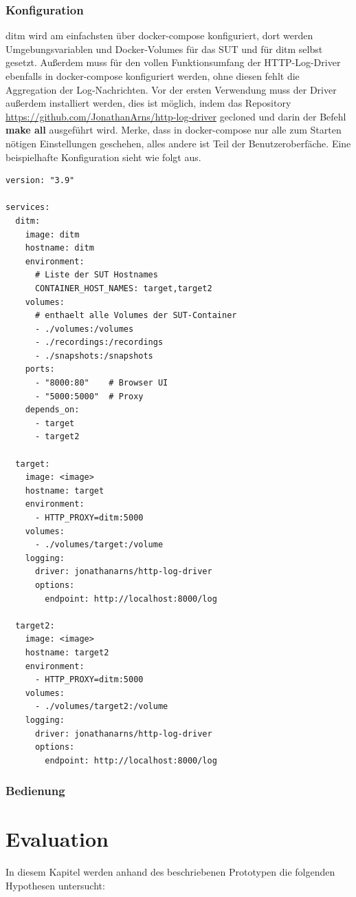 \documentclass[12pt,a4paper]{report}
\begin{document}
\subsection{Konfiguration}
ditm wird am einfachsten über docker-compose konfiguriert, dort werden Umgebungsvariablen und Docker-Volumes für das SUT und für
ditm selbst gesetzt. Außerdem muss für den vollen Funktionsumfang der HTTP-Log-Driver ebenfalls in docker-compose konfiguriert
werden, ohne diesen fehlt die Aggregation der Log-Nachrichten. Vor der ersten Verwendung muss der Driver außerdem installiert
werden, dies ist möglich, indem das Repository \url{https://github.com/JonathanArns/http-log-driver} gecloned und darin der Befehl
\textbf{make all} ausgeführt wird. Merke, dass in docker-compose nur alle zum Starten nötigen Einstellungen geschehen, alles andere ist Teil
der Benutzeroberfäche. Eine beispielhafte Konfiguration sieht wie folgt aus.
\begin{lstlisting}
version: "3.9"

services:
  ditm:
    image: ditm
    hostname: ditm
    environment:
      # Liste der SUT Hostnames
      CONTAINER_HOST_NAMES: target,target2  
    volumes:
      # enthaelt alle Volumes der SUT-Container
      - ./volumes:/volumes  
      - ./recordings:/recordings
      - ./snapshots:/snapshots
    ports:
      - "8000:80"    # Browser UI
      - "5000:5000"  # Proxy
    depends_on:
      - target
      - target2
  
  target:
    image: <image>
    hostname: target
    environment: 
      - HTTP_PROXY=ditm:5000
    volumes:
      - ./volumes/target:/volume
    logging:
      driver: jonathanarns/http-log-driver
      options:
        endpoint: http://localhost:8000/log

  target2:
    image: <image>
    hostname: target2
    environment: 
      - HTTP_PROXY=ditm:5000
    volumes:
      - ./volumes/target2:/volume
    logging:
      driver: jonathanarns/http-log-driver
      options:
        endpoint: http://localhost:8000/log
\end{lstlisting}

\subsection{Bedienung}

\chapter{Evaluation}
In diesem Kapitel werden anhand des beschriebenen Prototypen die folgenden Hypothesen untersucht:
\end{document}
